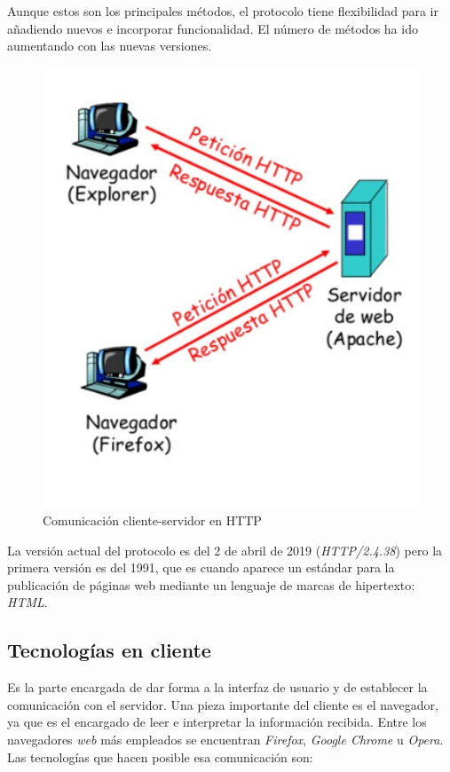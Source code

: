 Aunque estos son los principales métodos, el protocolo tiene flexibilidad para ir añadiendo nuevos e incorporar funcionalidad. El número de métodos ha ido aumentando con las nuevas versiones. 
\begin{figure}[h]
\centering
\includegraphics[scale=0.4]{img/http.jpeg}
\caption{Comunicación cliente-servidor en HTTP} \label{fig:http}
\end{figure}

La versión actual del protocolo es del 2 de abril de 2019 (\textit{HTTP/2.4.38}) pero la primera versión es del 1991, que es cuando aparece un estándar para la publicación de páginas web mediante un lenguaje de marcas de hipertexto: \textit{HTML}.


\subsection{Tecnologías en cliente}
\label{subsec:tecclient}
Es la parte encargada de dar forma a la interfaz de usuario y de establecer la comunicación con el servidor. Una pieza importante del cliente es el navegador, ya que es el encargado de leer e interpretar la información recibida. Entre los navegadores \textit{web} más empleados se encuentran \textit{Firefox}, \textit{Google Chrome} u \textit{Opera}\cite{bib:navegadores}. Las tecnologías que hacen posible esa comunicación son: 

